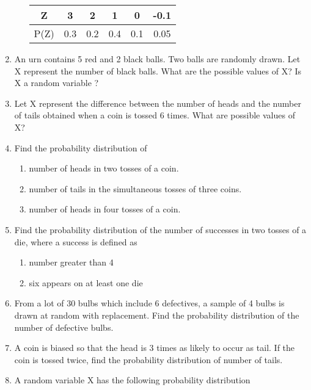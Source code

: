 \documentclass[12pt]{article}
\begin{document}
\begin{enumerate}
\begin{enumerate}
\begin{tabular}{|c|c|c|c|c|c|}
    \hline
    \cellcolor{blue!30}Z & \cellcolor{blue!60}3& \cellcolor{blue!50}2 & \cellcolor{blue!30}1& \cellcolor{blue!50}0& \cellcolor{blue!40}-0.1 \\
    \hline
    \cellcolor{blue!40}P(Z) & \cellcolor{blue!50}0.3& \cellcolor{blue!50}0.2& \cellcolor{blue!50}0.4& \cellcolor{blue!50}0.1& \cellcolor{blue!60}0.05 \\
    \hline
\end{tabular}
\end{enumerate}
\item An urn contains 5 red and 2 black balls. Two balls are randomly drawn. Let X
represent the number of black balls. What are the possible values of X? Is X a
random variable ? 
\
\item Let X represent the difference between the number of heads and the number of
tails obtained when a coin is tossed 6 times. What are possible values of X?

\item Find the probability distribution of
\begin{enumerate}
\item number of heads in two tosses of a coin.
\item number of tails in the simultaneous tosses of three coins.
\item number of heads in four tosses of a coin.
\end{enumerate}

\item Find the probability distribution of the number of successes in two tosses of a die,
where a success is defined as
\begin{enumerate}
\item number greater than 4
\item six appears on at least one die
\end{enumerate}
 

\item From a lot of 30 bulbs which include 6 defectives, a sample of 4 bulbs is drawn
at random with replacement. Find the probability distribution of the number of
defective bulbs.

\item A coin is biased so that the head is 3 times as likely to occur as tail. If the coin is
tossed twice, find the probability distribution of number of tails.
\item A random variable X has the following probability distribution\\


\end{enumerate}
\end{document}
